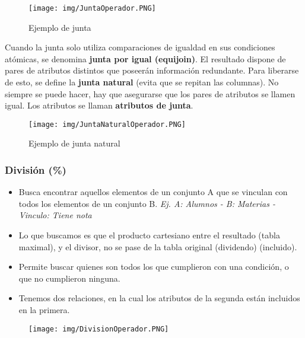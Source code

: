 \begin{figure}[!htb]
    \centering
    \texttt{[image: img/JuntaOperador.PNG]}
    \caption{Ejemplo de junta}
\end{figure}

Cuando la junta solo utiliza comparaciones de igualdad en sus condiciones atómicas, se denomina \textbf{junta por igual (equijoin)}.  El resultado dispone de pares de atributos distintos que poseerán información redundante. Para liberarse de esto, se define la \textbf{junta natural} (evita que se repitan las columnas). No siempre se puede hacer, hay que asegurarse que los pares de atributos se llamen igual. 
Los atributos se llaman \textbf{atributos de junta}.

\begin{figure}[!htb]
    \centering
    \texttt{[image: img/JuntaNaturalOperador.PNG]}
    \caption{Ejemplo de junta natural}
\end{figure}
\newpage

\subsubsection*{División (\%)}
\begin{itemize}
\item Busca encontrar aquellos elementos de un conjunto A que se vinculan con todos los elementos de un conjunto B. \textit{Ej. A: Alumnos - B: Materias - Vinculo: Tiene nota}
\item Lo que buscamos es que el producto cartesiano entre el resultado (tabla maximal), y el divisor, no se pase de la tabla original (dividendo) (incluido). 
\item Permite buscar quienes son todos los que cumplieron con una condición, o que no cumplieron ninguna.
\item Tenemos dos relaciones, en la cual los atributos de la segunda están incluidos en la primera.
\end{itemize}



\begin{figure}[!htb]
    \centering
    \texttt{[image: img/DivisionOperador.PNG]}
\end{figure}

